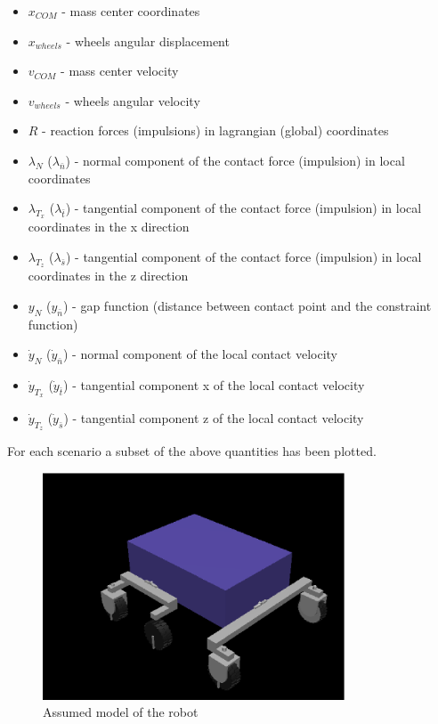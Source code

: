 \documentclass[a4paper]{article}
\begin{document}
\begin{itemize}
  \item $x_{COM}$ - mass center coordinates
  \item $x_{wheels}$ - wheels angular displacement 
  \item $v_{COM}$ - mass center velocity
  \item $v_{wheels}$ - wheels angular velocity
  \item $R$ - reaction forces (impulsions) in lagrangian (global) coordinates
  \item $\lambda_{N}$ ($\lambda_{\bar{n}}$) - normal component of the contact force (impulsion) in local coordinates
  \item $\lambda_{T_x}$ ($\lambda_{\bar{t}}$) - tangential component of the contact force (impulsion) in local coordinates in the x direction
  \item $\lambda_{T_z}$ ($\lambda_{\bar{s}}$) - tangential component of the contact force (impulsion) in local coordinates in the z direction
  \item $y_{N}$ ($y_{\bar{n}}$) - gap function (distance between contact point and the constraint function)
  \item $\dot{y}_{N}$ ($\dot{y}_{\bar{n}}$) - normal component of the local contact velocity
  \item $\dot{y}_{T_x}$ ($\dot{y}_{\bar{t}}$) - tangential component x of the local contact velocity
  \item $\dot{y}_{T_z}$ ($\dot{y}_{\bar{s}}$) - tangential component z of the local contact velocity
\end{itemize}

\noindent For each scenario a subset of the above quantities has been plotted.\\

\begin{figure}[h!]
  \centering
    \includegraphics[width=0.8\textwidth]{rovereps}
  \caption{Assumed model of the robot}
\end{figure}
\end{document}
